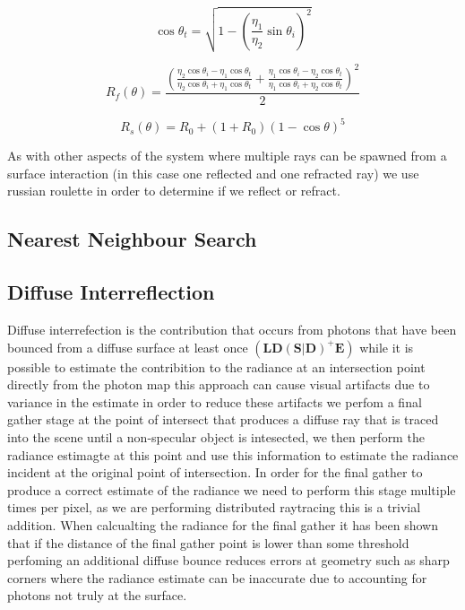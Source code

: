 
\begin{equation}
\cos{\theta_t} = \sqrt{1 - \left(\frac{\eta_1}{\eta_2}\sin{\theta_i}\right)^2}
\end{equation}

\begin{equation}
R_f(\theta)
=
\frac{
	\left(
	\frac
	{
	\eta_2 \cos{\theta_i} - \eta_1 \cos{\theta_t}
	}
	{
	\eta_2 \cos{\theta_i} + \eta_1 \cos{\theta_t}
	}
	+
	\frac
	{
	\eta_1 \cos{\theta_i} - \eta_2 \cos{\theta_t}
	}
	{
	\eta_1 \cos{\theta_i} + \eta_2 \cos{\theta_t}
	}
\right)^2
}{2}
\label{eq:fresnel}
\end{equation}

\begin{equation}
R_s(\theta)=R_0 + \left(1 + R_0\right)\left(1 - \cos\theta\right)^5
\label{eq:schlick}
\end{equation}

As with other aspects of the system where multiple rays can be spawned from a surface interaction (in this case one reflected and one refracted ray)
we use russian roulette in order to determine if we reflect or refract.

\subsection{Nearest Neighbour Search}

\subsection{Diffuse Interreflection}
Diffuse interrefection is the contribution that occurs from photons that have been bounced from a diffuse surface at least once
$(\mathbf{LD(S|D)^+E})$ while it is possible to estimate the contribition to the radiance at an intersection point directly from the photon map this
approach can cause visual artifacts due to variance in the estimate in order to reduce these artifacts we perfom a final gather
stage at the point of intersect that produces a diffuse ray that is traced into the scene until a non-specular object is intesected,
we then perform the radiance estimagte at this point and use this information to estimate the radiance incident at the original point of intersection.
In order for the final gather to produce a correct estimate of the radiance we need to perform this stage multiple times per pixel, as we
are performing distributed raytracing this is a trivial addition. When calcualting the radiance for the final gather it has been shown 
that if the distance of the final gather point is lower than some threshold perfoming an additional diffuse bounce reduces errors at geometry
such as sharp corners where the radiance estimate can be inaccurate due to accounting for photons not truly at the surface.

